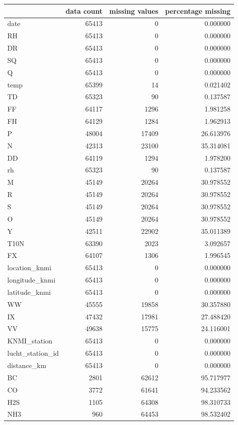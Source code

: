 \begin{tabular}{lrrr}
\toprule
 & data count & missing values & percentage missing \\
\midrule
date & 65413 & 0 & 0.000000 \\
RH & 65413 & 0 & 0.000000 \\
DR & 65413 & 0 & 0.000000 \\
SQ & 65413 & 0 & 0.000000 \\
Q & 65413 & 0 & 0.000000 \\
temp & 65399 & 14 & 0.021402 \\
TD & 65323 & 90 & 0.137587 \\
FF & 64117 & 1296 & 1.981258 \\
FH & 64129 & 1284 & 1.962913 \\
P & 48004 & 17409 & 26.613976 \\
N & 42313 & 23100 & 35.314081 \\
DD & 64119 & 1294 & 1.978200 \\
rh & 65323 & 90 & 0.137587 \\
M & 45149 & 20264 & 30.978552 \\
R & 45149 & 20264 & 30.978552 \\
S & 45149 & 20264 & 30.978552 \\
O & 45149 & 20264 & 30.978552 \\
Y & 42511 & 22902 & 35.011389 \\
T10N & 63390 & 2023 & 3.092657 \\
FX & 64107 & 1306 & 1.996545 \\
location_knmi & 65413 & 0 & 0.000000 \\
longitude_knmi & 65413 & 0 & 0.000000 \\
latitude_knmi & 65413 & 0 & 0.000000 \\
WW & 45555 & 19858 & 30.357880 \\
IX & 47432 & 17981 & 27.488420 \\
VV & 49638 & 15775 & 24.116001 \\
KNMI_station & 65413 & 0 & 0.000000 \\
lucht_station_id & 65413 & 0 & 0.000000 \\
distance_km & 65413 & 0 & 0.000000 \\
BC & 2801 & 62612 & 95.717977 \\
CO & 3772 & 61641 & 94.233562 \\
H2S & 1105 & 64308 & 98.310733 \\
NH3 & 960 & 64453 & 98.532402 \\

\end{tabular}
